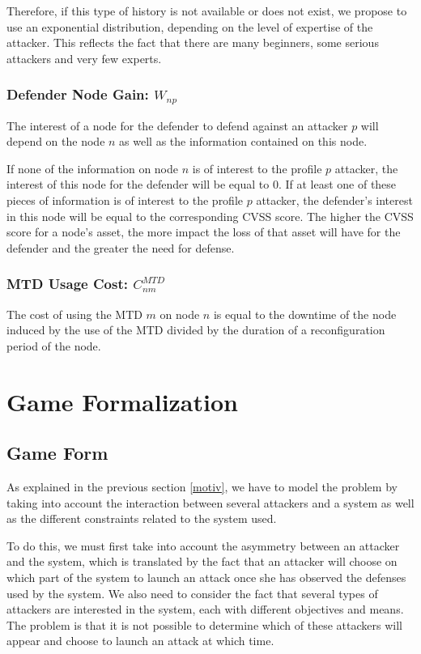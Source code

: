 Therefore, if this type of history is not available or does not exist, we propose to use an exponential distribution, depending on the level of expertise of the attacker. This reflects the fact that there are many  beginners, some serious attackers and very few experts.


\subsubsection{Defender Node Gain: $W_{np}$}
The interest of a node for the defender to defend against an attacker $p$ will depend on the node $n$ as well as the information contained on this node.

If none of the information on node $n$ is of interest to the profile $p$ attacker, the interest of this node for the defender will be equal to $0$. 
If at least one of these pieces of information is of interest to the profile $p$ attacker, the defender's interest in this node will be equal to the corresponding CVSS score. 
The higher the CVSS score for a node's asset, the more impact the loss of that asset will have for the defender and the greater the need for defense.

\subsubsection{MTD Usage Cost: $C^{MTD}_{nm}$}

The cost of using the MTD $m$ on node $n$ is equal to the downtime of the node induced by the use of the MTD divided by the duration of a reconfiguration period of the node.


\section {Game Formalization}

\subsection{Game Form}

{\huge A}s explained in the previous section \ref{motiv}, we have to model the problem by taking into account the interaction between several attackers and a system as well as the different constraints related to the system used.

To do this, we must first take into account the asymmetry between an attacker and the system, which is translated by the fact that an attacker will choose on which part of the system to launch an attack once she has observed the defenses used by the system.
%
We also need to consider the fact that several types of attackers are interested in the system, each with different objectives and means. The problem is that it is not possible to determine which of these attackers will appear and choose to launch an attack at which time. 

